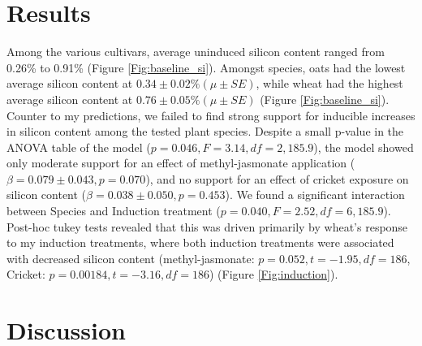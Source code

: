 \documentclass[12pt, letterpaper, ]{report}
\begin{document}
\section{Results}
Among the various cultivars, average uninduced silicon content ranged from 0.26\% to 0.91\% (Figure \ref{Fig:baseline_si}). Amongst species, oats had the lowest average silicon content at $0.34 \pm 0.02\% (\mu \pm SE)$, while wheat had the highest average silicon content at $0.76 \pm 0.05\% (\mu \pm SE)$ (Figure \ref{Fig:baseline_si}). Counter to my predictions, we failed to find strong support for inducible increases in silicon content among the tested plant species. Despite a small p-value in the ANOVA table of the model ($p = 0.046, F = 3.14, df = 2,185.9$), the model showed only moderate support for an effect of methyl-jasmonate application ($\beta = 0.079 \pm 0.043, p = 0.070$), and no support for an effect of cricket exposure on silicon content ($\beta = 0.038 \pm 0.050, p = 0.453$). We found a significant interaction between Species and Induction treatment ($p = 0.040, F = 2.52, df = 6,185.9$). Post-hoc tukey tests revealed that this was driven primarily by wheat's response to my induction treatments, where both induction treatments were associated with decreased silicon content (methyl-jasmonate: $p = 0.052, t = -1.95, df = 186$, Cricket: $p = 0.00184, t = -3.16, df = 186$) (Figure \ref{Fig:induction}). %

\section{Discussion}
\end{document}
